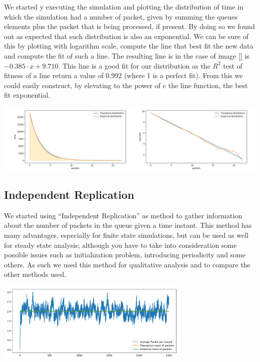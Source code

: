 \documentclass[10pt,a4paper]{article}
\begin{document}
We started y executing the simulation and plotting the distribution of time in which the simulation had a number of packet, given by summing the queues elements plus the packet that is being processed, if present. By doing so we found out as expected that such distribution is also an exponential. We can be sure of this by plotting with logarithm scale, compute the line that best fit the new data and compute the fit of such a line. The resulting line is in the case of image \ref{} is \(-0.385 \cdot x +  9.710\). This line is a good fit for our distribution as the \(R^2\) test of fitness of a line return a value of 0.992 (where 1 is a perfect fit).
From this we could easily construct, by elevating to the power of \(e\) the line function, the best fit exponential.
\begin{center}
	\includegraphics[width=\textwidth]{img/time-with-fixed-packet-n.png}
	\label{fig:time-with-fixed-packet-n}
\end{center}


\subsection*{Independent Replication}

We started using ``Independent Replication'' as method to gather information about the number of packets in the queue given a time instant. This method has many advantages, especially for finite state simulations, but can be used as well for steady state analysis; although you have to take into consideration some possible issues such as initialization problem, introducing periodicity and some others. As such we used this method for qualitative analysis and to compare the other methods used.

\begin{center}
	\includegraphics[width=0.7\textwidth]{independent-replication-with-bias.png}
	\label{fig:independent-replication-with-bias}
\end{center}
\end{document}
